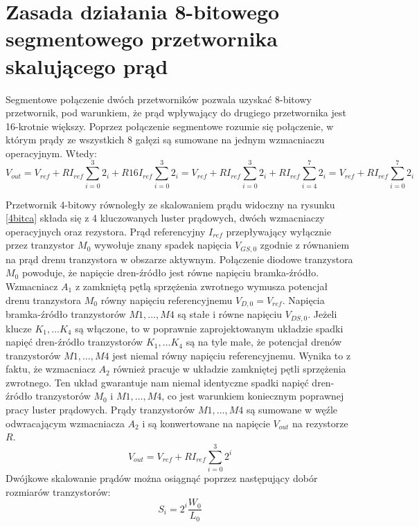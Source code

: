 \documentclass[10pt,a4paper,twoside]{report}
\theoremstyle{definition}
\theoremstyle{definition}
\theoremstyle{definition}
\theoremstyle{definition}
\theoremstyle{definition}
\begin{document}
{{	
	\section{Zasada działania 8-bitowego segmentowego przetwornika skalującego prąd}
{ Segmentowe połączenie dwóch przetworników pozwala uzyskać 8-bitowy przetwornik, pod warunkiem, że prąd wpływający do drugiego przetwornika jest 16-krotnie większy. Poprzez połączenie segmentowe rozumie się połączenie, w którym prądy ze wszystkich 8 gałęzi są sumowane na jednym wzmacniaczu operacyjnym. Wtedy:
	\begin{equation}
	V_{out} = V_{ref} + R I_{ref} \sum_{i=0}^{3} 2_i + R 16 I_{ref} \sum_{i=0}^{3} 2_i
	= V_{ref} + R I_{ref} \sum_{i=0}^{3} 2_i + R I_{ref} \sum_{i=4}^{7} 2_i
	= V_{ref} + R I_{ref} \sum_{i=0}^{7} 2_i
	\end{equation}
}

{	Przetwornik 4-bitowy równoległy ze skalowaniem prądu widoczny na rysunku \ref{4bitca} składa się z 4 kluczowanych luster prądowych, dwóch wzmacniaczy operacyjnych oraz rezystora. Prąd referencyjny $I_{ref}$ przepływający wyłącznie przez tranzystor $M_0$ wywołuje znany spadek napięcia $V_{GS,0}$ zgodnie z równaniem na prąd drenu tranzystora w obszarze aktywnym. Połączenie diodowe tranzystora $M_0$ powoduje, że napięcie dren-źródło jest równe napięciu bramka-źródło. Wzmacniacz $A_1$ z zamkniętą pętlą sprzężenia zwrotnego wymusza potencjał drenu tranzystora $M_0$ równy napięciu referencyjnemu $V_{D,0} = V_{ref}$. Napięcia bramka-źródło tranzystorów $M1,\dots, M4$ są stałe i równe napięciu $V_{DS,0}$. Jeżeli klucze $K_1, \dots K_4$ są włączone, to w poprawnie zaprojektowanym układzie spadki napięć dren-źródło tranzystorów $K_1, \dots K_4$ są na tyle małe, że potencjał drenów tranzystorów $M1,\dots, M4$ jest niemal równy napięciu referencyjnemu. Wynika to z faktu, że wzmacniacz $A_2$ również pracuje w układzie zamkniętej pętli sprzężenia zwrotnego. Ten układ gwarantuje nam niemal identyczne spadki napięć dren-źródło tranzystorów $M_0$ i $M1,\dots, M4$, co jest warunkiem koniecznym poprawnej pracy luster prądowych. Prądy tranzystorów $M1,\dots, M4$ są sumowane w węźle odwracającym wzmacniacza $A_2$ i są konwertowane na napięcie $V_{out}$ na rezystorze $R$.}
\begin{equation}
V_{out} = V_{ref} + R I_{ref} \sum_{i=0}^{3} 2^i 
\end{equation}
{	Dwójkowe skalowanie prądów można osiągnąć poprzez następujący dobór rozmiarów tranzystorów:}
\begin{equation}
S_i = 2^i \frac{W_0}{L_0}
\end{equation}

}}
\end{document}
